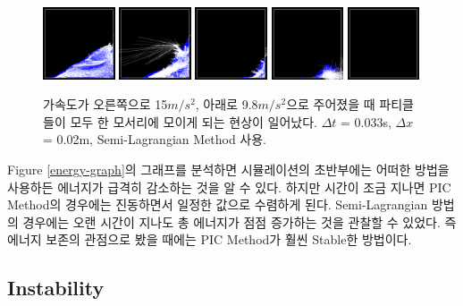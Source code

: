 \documentclass[11pt, A4]{article}
\begin{document}
\begin{figure}[h!]
  \centering
  \includegraphics[width=0.19\textwidth]{explode1}
  \includegraphics[width=0.19\textwidth]{explode2}
  \includegraphics[width=0.19\textwidth]{explode3}
  \includegraphics[width=0.19\textwidth]{explode4}
  \includegraphics[width=0.19\textwidth]{explode5}
  \caption{가속도가 오른쪽으로 15$m/s^2$, 아래로 9.8$m/s^2$으로 주어졌을 때 파티클들이 모두 한 모서리에 모이게 되는 현상이 일어났다. $\Delta t$ = 0.033s, $\Delta x$ = 0.02m, Semi-Lagrangian Method 사용.}
  \label{explode}
\end{figure}


Figure \ref{energy-graph}의 그래프를 분석하면 시뮬레이션의 초반부에는 어떠한 방법을 사용하든 에너지가 급격히 감소하는 것을 알 수 있다. 하지만 시간이 조금 지나면 PIC Method의 경우에는 진동하면서 일정한 값으로 수렴하게 된다. Semi-Lagrangian 방법의 경우에는 오랜 시간이 지나도 총 에너지가 점점 증가하는 것을 관찰할 수 있었다. 즉 에너지 보존의 관점으로 봤을 때에는 PIC Method가 훨씬 Stable한 방법이다.

\subsection{Instability}
\end{document}
